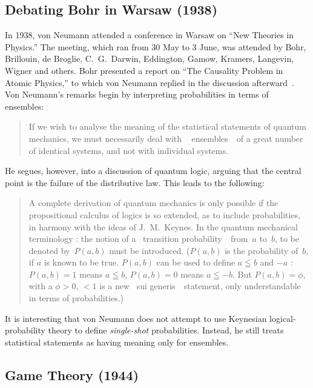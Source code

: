 \documentclass[aps,pra,superscriptaddress,12pt,tightenlines,nofootinbib]{revtex4}
\newcommand{\ogm}{\guillemotleft~}
\newcommand{\cgm}{~\guillemotright}
\begin{document}
\subsection{Debating Bohr in Warsaw (1938)}

In 1938, von Neumann attended a conference in Warsaw on ``New Theories
in Physics.''  The meeting, which ran from 30 May to 3 June, was
attended by Bohr, Brillouin, de Broglie, C.\ G.\ Darwin, Eddington,
Gamow, Kramers, Langevin, Wigner and others.  Bohr presented a report
on ``The Causality Problem in Atomic Physics,'' to which von Neumann
replied in the discussion afterward~\cite{VN-WARSAW}.  Von Neumann's
remarks begin by interpreting probabilities in terms of ensembles:
\begin{quotation}
If we wish to analyse the meaning of the statistical statements of
quantum mechanics, we must necessarily deal with \ogm
ensembles\cgm\ of a great number of identical systems, and not with
individual systems.
\end{quotation}
He segues, however, into a discussion of quantum logic, arguing that
the central point is the failure of the distributive law.  This leads
to the following:
\begin{quotation}
A complete derivation of quantum mechanics is only possible if the
propositional calculus of logics is so extended, as to include
probabilities, in harmony with the ideas of J.\ M.\ Keynes.  In the
quantum mechanical terminology : the notion of a \ogm transition
probability\cgm\ from~$a$ to~$b$, to be denoted by~$P(a,b)$ must be
introduced.  ($P(a,b)$ is the probability of~$b$, if $a$ is known to
be true.  $P(a,b)$ can be used to define $a \leqq b$ and $-a$ : $P(a,b)
= 1$ means $a \leqq b$, $P(a,b) = 0$ means $a \leqq -b$.  But $P(a,b) =
\phi$, with a $\phi > 0$, $< 1$ is a new \ogm sui
generis\cgm\ statement, only understandable in terms of
probabilities.)
\end{quotation}

It is interesting that von Neumann does not attempt to use Keynesian
logical-probability theory to define \emph{single-shot}
probabilities.  Instead, he still treats statistical statements as
having meaning only for ensembles.

\subsection{Game Theory (1944)}
\end{document}
